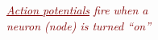 \documentclass[xcolor={dvipsnames}]{beamer}
\begin{document}
{\begin{columns}
\begin{column}{.5\textwidth}

\vspace{-1.5em}


\textcolor{Maroon}{
\emph{\underline{Action potentials} fire when a \\ neuron (node) is turned ``on''}}


\end{column}
\end{columns}

}
\end{document}
